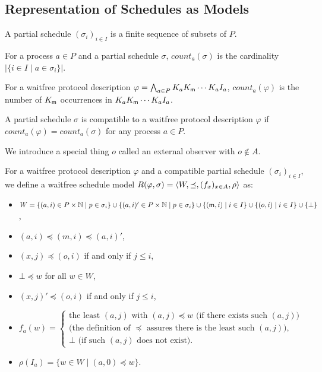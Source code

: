   \subsection{Representation of Schedules as Models}

  \begin{definition}
   A partial schedule $(\sigma_i)_{i\in I}$ is a finite sequence of
   subsets of $P$.
  \end{definition}

  \begin{definition}
   For a process $a\in P$ and a partial schedule $\sigma$, $count_a(\sigma)$ is the cardinality
   $\left|\{i\in I\mid a\in \sigma_i\}\right|$.

   For a waitfree protocol description $\varphi = \bigwedge_{a\in P}K_a K_{\sf m} \cdots K_a I_a$,
   $count_a(\varphi)$ is the number of $K_{\sf m}$ occurrences in $K_aK_{\sf m} \cdots
   K_a I_a$.

   A partial schedule $\sigma$ is compatible to a waitfree
   protocol description $\varphi$ if
   $count_a(\varphi) = count_a(\sigma)$ for any process $a\in P$.
  \end{definition}

  We introduce a special thing $o$ called an external observer with $o \notin A$.
  \begin{definition}
   For a waitfree protocol description $\varphi$ and
   a compatible partial schedule $(\sigma_i)_{i\in I}$, we define
   a waitfree schedule model $R(\varphi, \sigma) = \langle{W, \preceq, (f_x)_{x\in A}, \rho}\rangle$ as:
   \begin{itemize}
    \item $
	  W = \{(a,i) \in P\times \mathbb N \mid p\in \sigma_i\} \cup
	  \{(a,i)' \in P\times \mathbb N \mid p\in \sigma_i\}
	  \cup \{({\sf m},i)\mid i\in I\} \cup \{(o,i) \mid i\in I\}\cup
	  \{\bot\}
	  $,
    \item $(a,i) \preceq (m, i)\preceq (a, i)'$,
    \item $(x,j)\preceq (o,i)$ if and only if $j\le i$,
    \item $\bot\preceq w$ for all $w \in W$,
    \item $(x,j)'\preceq (o,i)$ if and only if $j \le i$,
    \item
	 $
	 f_a(w) =
	 \left\{
	 \begin{array}{l}
	  \mbox{the least $(a,j)$ with $(a,j)\preceq w$ (if there exists such $(a,j)$)} \\
	  \mbox{(the definition of $\preceq$ assures there is the least such $(a,j)$)},\\
	  \mbox{$\bot$ (if such $(a,j)$ does not exist)}.
	 \end{array}
	 \right.
	 $
    \item $\rho(I_a) = \{w\in W\mid (a,0)\preceq w\}$.
   \end{itemize}
  \end{definition}

